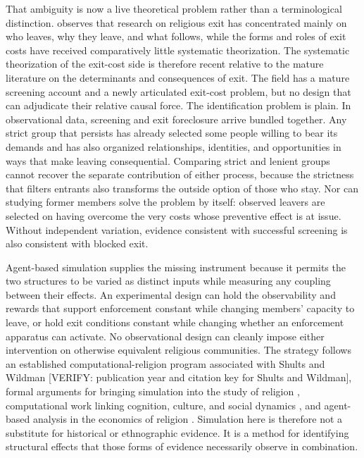 That ambiguity is now a live theoretical problem rather than a terminological distinction. \citet{bok2025} observes that research on religious exit has concentrated mainly on who leaves, why they leave, and what follows, while the forms and roles of exit costs have received comparatively little systematic theorization. The systematic theorization of the exit-cost side is therefore recent relative to the mature literature on the determinants and consequences of exit. The field has a mature screening account and a newly articulated exit-cost problem, but no design that can adjudicate their relative causal force. The identification problem is plain. In observational data, screening and exit foreclosure arrive bundled together. Any strict group that persists has already selected some people willing to bear its demands and has also organized relationships, identities, and opportunities in ways that make leaving consequential. Comparing strict and lenient groups cannot recover the separate contribution of either process, because the strictness that filters entrants also transforms the outside option of those who stay. Nor can studying former members solve the problem by itself: observed leavers are selected on having overcome the very costs whose preventive effect is at issue. Without independent variation, evidence consistent with successful screening is also consistent with blocked exit.

Agent-based simulation supplies the missing instrument because it permits the two structures to be varied as distinct inputs while measuring any coupling between their effects. An experimental design can hold the observability and rewards that support enforcement constant while changing members' capacity to leave, or hold exit conditions constant while changing whether an enforcement apparatus can activate. No observational design can cleanly impose either intervention on otherwise equivalent religious communities. The strategy follows an established computational-religion program associated with Shults and Wildman [VERIFY: publication year and citation key for Shults and Wildman], formal arguments for bringing simulation into the study of religion \citep{wildmansosis2011}, computational work linking cognition, culture, and social dynamics \citep{gorelemosshultswildman2018}, and agent-based analysis in the economics of religion \citep{iannacconemakowsky2007}. Simulation here is therefore not a substitute for historical or ethnographic evidence. It is a method for identifying structural effects that those forms of evidence necessarily observe in combination.

